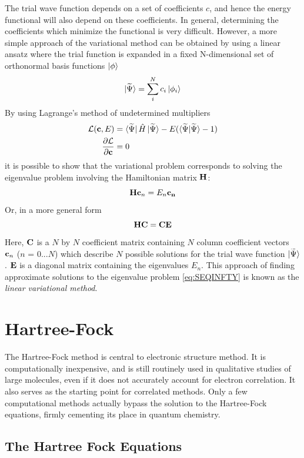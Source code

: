 The trial wave function depends on a set of coefficients $c$, and hence the energy functional will also depend on these coefficients. In general, determining the coefficients which minimize the functional is very difficult. However, a more simple approach of the variational method can be obtained by using a linear ansatz where the trial function is expanded in a fixed N-dimensional set of orthonormal basis functions $\ket{\phi}$
\begin{equation}
\ket{\smash{\widetilde{\Psi}}} = \sum^N_i c_i \ket{\phi_i}
\end{equation}
By using Lagrange's method of undetermined multipliers
\begin{align}
\mathcal{L}(\mathbf{c},E) &= \bra{\smash{\widetilde{\Psi}}}\hat{H}\ket{\smash{\widetilde{\Psi}}} - E(\bra{\smash{\widetilde{\Psi}}}\ket{\smash{\widetilde{\Psi}}} - 1) \\
\frac{\partial \mathcal{L}}{\partial \mathcal{\mathbf{c}}} &= 0
\end{align}
\noindent it is possible to show that the variational problem corresponds to solving the eigenvalue problem involving the Hamiltonian matrix $\mathbf{H}$:
\begin{equation}
\mathbf{H}\mathbf{c}_n = E_n \mathbf{c_n}
\end{equation}
\noindent Or, in a more general form
\begin{equation}
\mathbf{H}\mathbf{C} = \mathbf{C}\mathbf{E}
\end{equation}
\noindent Here, $\mathbf{C}$ is a $N$ by $N$ coefficient matrix containing $N$ column coefficient vectors $\mathbf{c}_n$ ($n$ = $0...N$) which describe $N$ possible solutions for the trial wave function $\ket{\smash{\widetilde{\Psi}}}$. $\mathbf{E}$ is a diagonal matrix containing the eigenvalues $E_n$. This approach of finding approximate solutions to the eigenvalue problem \ref{eq:SEQINFTY} is known as the \emph{linear variational method}. 

\section{Hartree-Fock}

The Hartree-Fock method is central to electronic structure method. It is computationally inexpensive, and is still routinely used in qualitative studies of large molecules, even if it does not accurately account for electron correlation. It also serves as the starting point for correlated methods. Only a few computational methods actually bypass the solution to the Hartree-Fock equations, firmly cementing its place in quantum chemistry.

\subsection{The Hartree Fock Equations}

